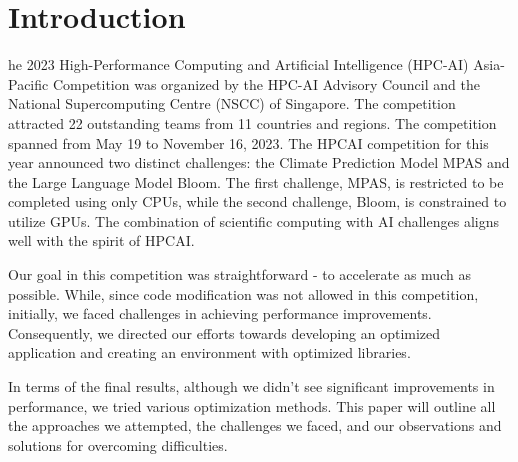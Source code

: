 \section{Introduction}
\label{sec:intro}

he 2023 High-Performance Computing and Artificial Intelligence (HPC-AI) Asia-Pacific Competition was organized by the HPC-AI Advisory Council and the National Supercomputing Centre (NSCC) of Singapore. The competition attracted 22 outstanding teams from 11 countries and regions. The competition spanned from May 19 to November 16, 2023. The HPCAI competition for this year announced two distinct challenges: the Climate Prediction Model MPAS and the Large Language Model Bloom. The first challenge, MPAS, is restricted to be completed using only CPUs, while the second challenge, Bloom, is constrained to utilize GPUs. The combination of scientific computing with AI challenges aligns well with the spirit of HPCAI.

Our goal in this competition was straightforward - to accelerate as much as possible. While, since code modification was not allowed in this competition, initially, we faced challenges in achieving performance improvements. Consequently, we directed our efforts towards developing an optimized application and creating an environment with optimized libraries.

In terms of the final results, although we didn't see significant improvements in performance, we tried various optimization methods. This paper will outline all the approaches we attempted, the challenges we faced, and our observations and solutions for overcoming difficulties.
